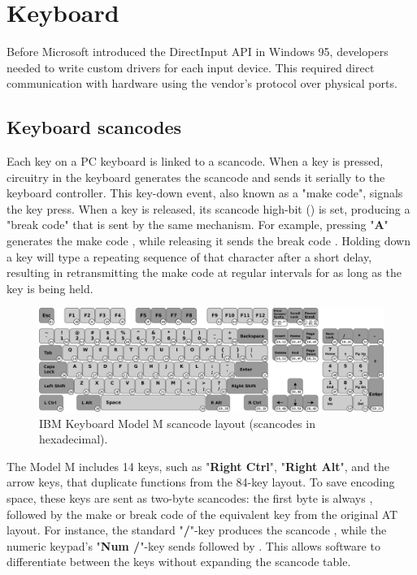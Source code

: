 \documentclass[book.tex]{subfiles}
\begin{document}
\section{Keyboard}
Before Microsoft introduced the DirectInput API in Windows 95, developers needed to write custom drivers for each input device. This required direct communication with hardware using the vendor's protocol over physical ports. 


\subsection{Keyboard scancodes}
\par
Each key on a PC keyboard is linked to a scancode. When a key is pressed, circuitry in the keyboard generates the scancode and sends it serially to the keyboard controller. This key-down event, also known as a "make code", signals the key press. When a key is released, its scancode high-bit () is set, producing a "break code" that is sent by the same mechanism. For example, pressing "\textbf{A}" generates the make code , while releasing it sends the break code . Holding down a key will type a repeating sequence of that character after a short delay, resulting in retransmitting the make code at regular intervals for as long as the key is being held.\\

\begin{figure}[H]
\centering
      \includegraphics[width=1.0\textwidth]{imgs/drawings/keyboard_model_M.eps}
      \caption{IBM Keyboard Model M scancode layout (scancodes in hexadecimal).}
\end{figure}

\par
The Model M includes 14 keys, such as "\textbf{Right Ctrl}", "\textbf{Right Alt}", and the arrow keys, that duplicate functions from the 84-key layout. To save encoding space, these keys are sent as two-byte scancodes: the first byte is always , followed by the make or break code of the equivalent key from the original AT layout. For instance, the standard "\textbf{/}"-key produces the scancode , while the numeric keypad's "\textbf{Num /}"-key sends  followed by . This allows software to differentiate between the keys without expanding the scancode table.\\
\end{document}
